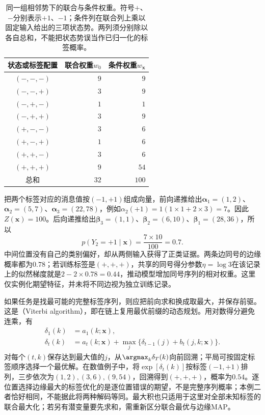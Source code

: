 \begin{table}[htbp]
  \centering
  \begin{tabular}{crr}
    \toprule
    状态或标签配置 & 联合权重$w_0$ & 条件权重$w_{\bm{x}}$\\
    \midrule
    $(-,-,-)$ & $9$ & $9$\\
    $(-,-,+)$ & $3$ & $9$\\
    $(-,+,-)$ & $1$ & $1$\\
    $(-,+,+)$ & $3$ & $9$\\
    $(+,-,-)$ & $3$ & $6$\\
    $(+,-,+)$ & $1$ & $6$\\
    $(+,+,-)$ & $3$ & $6$\\
    $(+,+,+)$ & $9$ & $54$\\
    \midrule
    总和 & $32$ & $100$\\
    \bottomrule
  \end{tabular}
  \caption{同一组相邻势下的联合与条件权重。符号$+$、$-$分别表示$+1$、$-1$；条件列在联合列上乘以固定输入给出的三项状态势。两列须分别除以各自总和，不能把状态势误当作已归一化的标签概率。}
  \label{tab:pgm-energy-models-chain-weights}
\end{table}

把两个标签对应的消息值按$(-1,+1)$组成向量，前向递推给出$\bm{\alpha}_1=(1,2)$、$\bm{\alpha}_2=(5,7)$、$\bm{\alpha}_3=(22,78)$，例如$\alpha_2(+1)=1(1\times1+2\times3)=7$。因此$Z(\bm{x})=100$。后向递推给出$\bm{\beta}_3=(1,1)$、$\bm{\beta}_2=(6,10)$、$\bm{\beta}_1=(28,36)$，所以
\[
  p(Y_2=+1\mid\bm{x})=\frac{7\times10}{100}=0.7.
\]
中间位置没有自己的类别偏好，却从两侧输入获得了正类证据。两条边同号的边缘概率都为$0.78$；若训练标签是$(+,+,+)$，共享的同号得分参数$\eta=\log3$在该记录上的似然梯度就是$2-2\times0.78=0.44$，推动模型增加同号序列的相对权重。这里仅实例化期望特征，并未将不同边视为独立训练记录。

如果任务是找最可能的完整标签序列，则应把前向求和换成取最大，并保存前驱。这是（Viterbi algorithm），即在链上复用最优前缀的动态规划。用对数得分避免连乘，有
\begin{equation}
  \begin{aligned}
    \delta_1(k)&=a_1(k;\bm{x}),\\
    \delta_t(k)&=a_t(k;\bm{x})
       +\max_j\{\delta_{t-1}(j)+b_t(j,k;\bm{x})\}.
  \end{aligned}
  \label{eq:pgm-energy-models-viterbi}
\end{equation}
对每个$(t,k)$保存达到最大值的$j$，从$\argmax_k\delta_T(k)$向前回溯；平局可按固定标签顺序选择一个最优解。在数值例子中，将$\exp[\delta_t(k)]$按标签$(-1,+1)$排列，三步依次为$(1,2),(3,6),(9,54)$，回溯得到$(+,+,+)$，概率为$0.54$。逐位置选择边缘最大的标签优化的是逐位置错误的期望，不是完整序列概率；本例二者恰好相同，不能据此将两种解码等同。最大积也只适用于这里对全部未知标签的联合最大化；若另有潜变量要先求和，需重新区分联合最优与边缘MAP。

